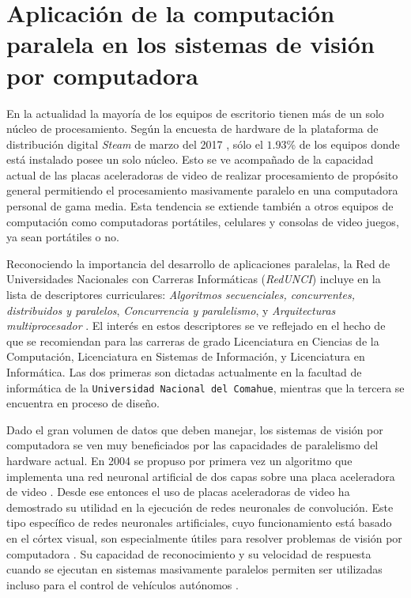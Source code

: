 \section{Aplicación de la computación paralela en los sistemas de visión por
computadora}

\label{algoritmosParalelosYVision}

En la actualidad la mayoría de los equipos de escritorio tienen más de un solo
núcleo de procesamiento. Según la encuesta de hardware de la plataforma de
distribución digital \emph{Steam} de marzo del 2017 \cite{steamSurvey}, sólo
el $1.93$\% de los equipos donde está instalado posee un solo núcleo. Esto se
ve acompañado de la capacidad actual de las placas aceleradoras de video de
realizar procesamiento de propósito general permitiendo el procesamiento
masivamente paralelo en una computadora personal de gama media. Esta tendencia
se extiende también a otros equipos de computación como computadoras
portátiles, celulares y consolas de video juegos, ya sean portátiles o no.

Reconociendo la importancia del desarrollo de aplicaciones paralelas, la Red
de Universidades Nacionales con Carreras Informáticas (\emph{RedUNCI}) incluye
en la lista de descriptores curriculares: \emph{Algoritmos secuenciales,
concurrentes, distribuidos y paralelos}, \emph{Concurrencia y paralelismo}, y
\emph{Arquitecturas multiprocesador} \cite{RedUNCI2015}. El interés en estos
descriptores se ve reflejado en el hecho de que se recomiendan para las
carreras de grado Licenciatura en Ciencias de la Computación, Licenciatura en
Sistemas de Información, y Licenciatura en Informática. Las dos primeras son
dictadas actualmente en la facultad de informática de la \texttt{Universidad
Nacional del Comahue}, mientras que la tercera se encuentra en proceso de
diseño.

Dado el gran volumen de datos que deben manejar, los sistemas de visión por
computadora se ven muy beneficiados por las capacidades de paralelismo del
hardware actual. En 2004 se propuso por primera vez un algoritmo que implementa
una red neuronal artificial de dos capas sobre una placa aceleradora de video
\cite{GPUforMLA}. Desde ese entonces el uso de placas aceleradoras de video ha
demostrado su utilidad en la ejecución de redes neuronales de convolución. Este
tipo específico de redes neuronales artificiales, cuyo funcionamiento está
basado en el córtex visual, son especialmente útiles para resolver problemas de
visión por computadora \cite{usingCCN4IR2015}. Su capacidad de reconocimiento y
su velocidad de respuesta cuando se ejecutan en sistemas masivamente paralelos
permiten ser utilizadas incluso para el control de vehículos autónomos
\cite{e2eLearning4SDC}.

